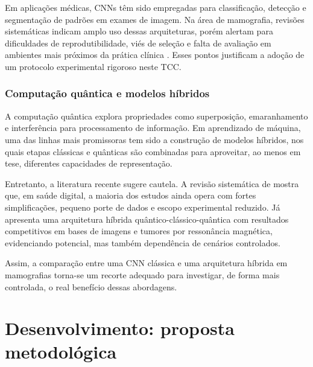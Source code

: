 \documentclass[
    12pt,
    openright,
    oneside,
    a4paper,
    english,
    brazil
]{abntex2}
\begin{document}
Em aplicações médicas, CNNs têm sido empregadas para classificação, detecção e segmentação de padrões em exames de imagem. Na área de mamografia, revisões sistemáticas indicam amplo uso dessas arquiteturas, porém alertam para dificuldades de reprodutibilidade, viés de seleção e falta de avaliação em ambientes mais próximos da prática clínica \cite{Bhalla2023MammographyReview}. Esses pontos justificam a adoção de um protocolo experimental rigoroso neste TCC.

\subsection{Computação quântica e modelos híbridos}

A computação quântica explora propriedades como superposição, emaranhamento e interferência para processamento de informação. Em aprendizado de máquina, uma das linhas mais promissoras tem sido a construção de modelos híbridos, nos quais etapas clássicas e quânticas são combinadas para aproveitar, ao menos em tese, diferentes capacidades de representação.

Entretanto, a literatura recente sugere cautela. A revisão sistemática de  mostra que, em saúde digital, a maioria dos estudos ainda opera com fortes simplificações, pequeno porte de dados e escopo experimental reduzido. Já  apresenta uma arquitetura híbrida quântico-clássico-quântica com resultados competitivos em bases de imagens e tumores por ressonância magnética, evidenciando potencial, mas também dependência de cenários controlados.

Assim, a comparação entre uma CNN clássica e uma arquitetura híbrida em mamografias torna-se um recorte adequado para investigar, de forma mais controlada, o real benefício dessas abordagens.




\chapter{Desenvolvimento: proposta metodológica}
\end{document}
